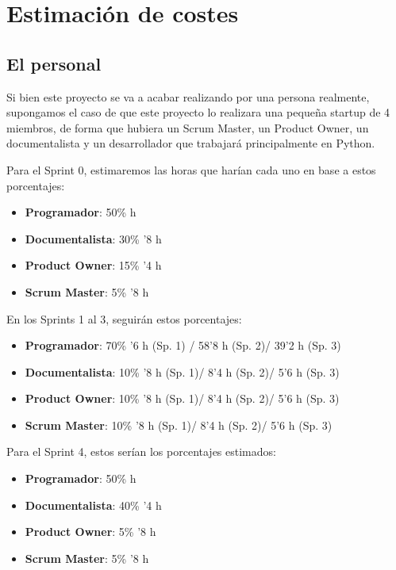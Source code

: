 \section{Estimación de costes}
\subsection{El personal}
Si bien este proyecto se va a acabar realizando por una persona realmente, supongamos el caso de que este proyecto lo realizara una pequeña startup de 4 miembros, de forma que hubiera un Scrum Master, un Product Owner, un documentalista y un desarrollador que trabajará principalmente en Python.

Para el Sprint 0, estimaremos las horas que harían cada uno en base a estos porcentajes:
\begin{itemize}
	\item \textbf{Programador}: 50\%  h
	\item \textbf{Documentalista}: 30\% '8 h
	\item \textbf{Product Owner}: 15\% '4 h
	\item \textbf{Scrum Master}: 5\% '8 h
\end{itemize}

En los Sprints 1 al 3, seguirán estos porcentajes:
\begin{itemize}
	\item \textbf{Programador}: 70\% '6 h (Sp. 1) / 58'8 h (Sp. 2)/ 39'2 h (Sp. 3)
	\item \textbf{Documentalista}: 10\% '8 h (Sp. 1)/ 8'4 h (Sp. 2)/ 5'6 h (Sp. 3)
	\item \textbf{Product Owner}: 10\% '8 h (Sp. 1)/ 8'4 h (Sp. 2)/ 5'6 h (Sp. 3)
	\item \textbf{Scrum Master}: 10\% '8 h (Sp. 1)/ 8'4 h (Sp. 2)/ 5'6 h (Sp. 3)
\end{itemize}

Para el Sprint 4, estos serían los porcentajes estimados:
\begin{itemize}
	\item \textbf{Programador}: 50\%  h
	\item \textbf{Documentalista}: 40\% '4 h
	\item \textbf{Product Owner}: 5\% '8 h
	\item \textbf{Scrum Master}: 5\% '8 h
\end{itemize}

